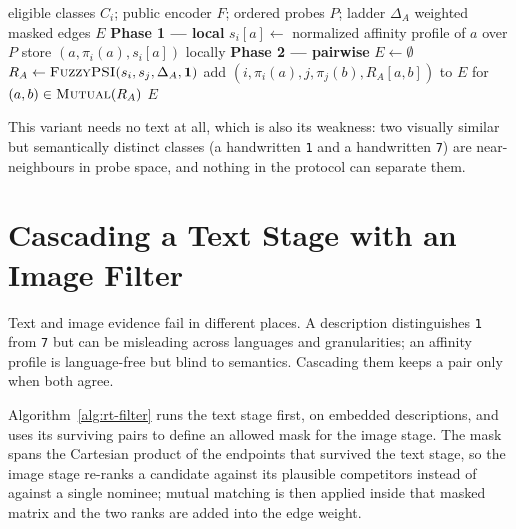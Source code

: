 \documentclass[conference]{IEEEtran}
\newcommand{\Ind}{\mathbf{1}}
\newcommand{\Mutual}{\textsc{Mutual}}
\newcommand{\FuzzyPSI}{\textsc{FuzzyPSI}}
\begin{document}
\begin{algorithm}[t]
\caption{Relation table via affinity profiles and fuzzy PSI}
\label{alg:rt-aff}
\begin{algorithmic}[1]
\Require eligible classes $C_i$; public encoder $F$; ordered probes $P$; ladder $\Delta_A$
\Ensure weighted masked edges $E$
  \Statex \textbf{Phase 1 --- local}
    \State $s_i[a]\gets$ normalized affinity profile of $a$ over $P$
    \State store $(a,\pi_i(a),s_i[a])$ locally
  \EndFor
  \Statex \textbf{Phase 2 --- pairwise}
  \State $E\gets\emptyset$
    \State $R_A\gets\FuzzyPSI(s_i,s_j,\Delta_A,\Ind)$
    \State add $(i,\pi_i(a),j,\pi_j(b),R_A[a,b])$ to $E$ for $(a,b)\in\Mutual(R_A)$
  \EndFor
  \State \Return $E$
\end{algorithmic}
\end{algorithm}

This variant needs no text at all, which is also its weakness: two
visually similar but semantically distinct classes (a handwritten
\texttt{1} and a handwritten \texttt{7}) are near-neighbours in probe
space, and nothing in the protocol can separate them.

\section{Cascading a Text Stage with an Image Filter}
\label{sec:filter}

Text and image evidence fail in different places. A description
distinguishes \texttt{1} from \texttt{7} but can be misleading across
languages and granularities; an affinity profile is language-free but
blind to semantics. Cascading them keeps a pair only when both agree.

Algorithm~\ref{alg:rt-filter} runs the text stage first, on embedded
descriptions, and uses its surviving pairs to define an allowed mask for
the image stage. The mask spans the Cartesian product of the endpoints
that survived the text stage, so the image stage re-ranks a candidate
against its plausible competitors instead of against a single nominee;
mutual matching is then applied inside that masked matrix and the two
ranks are added into the edge weight.
\end{document}
